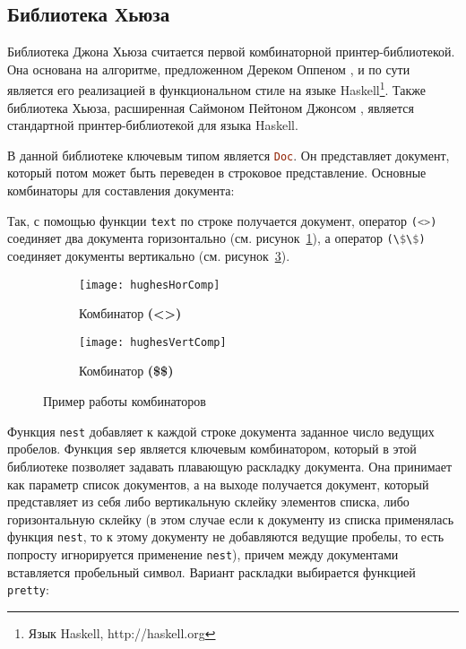 \subsection{Библиотека Хьюза}

Библиотека Джона Хьюза\cite{hughes} считается первой комбинаторной принтер-библиотекой. Она основана на алгоритме, предложенном Дереком Оппеном \cite{oppen}, и по сути является его реализацией в функциональном стиле на языке Haskell\footnote{Язык Haskell, http://haskell.org}. Также библиотека Хьюза, расширенная Саймоном Пейтоном Джонсом \cite{peytonJones}, является стандартной принтер-библиотекой для языка Haskell.


В данной библиотеке ключевым типом является \lstinline[language=Haskell]{Doc}. Он представляет документ, который потом может быть переведен в строковое представление.
Основные комбинаторы для составления документа:


Так, с помощью функции \lstinline[language=Haskell]{text} по строке получается документ, оператор \lstinline[language=Haskell]{(<>)} соединяет два документа горизонтально (см. рисунок~\ref{fig:hughesHorComp}), а оператор \lstinline[language=Haskell]{(\$\$)} соединяет документы вертикально (см. рисунок~\ref{fig:hughesVertComp}).

\begin{figure}[ht]
	\begin{subfigure}[b]{0.45\linewidth}
		\centering
		\texttt{[image: hughesHorComp]}
		\caption{Комбинатор \textbf{(<>)}}
		\label{fig:hughesHorComp}
	\end{subfigure}
	\hspace{0.5cm}
	\begin{subfigure}[b]{0.45\linewidth}
		\centering
		\texttt{[image: hughesVertComp]}
		\caption{Комбинатор \textbf{(\$\$)}}
		\label{fig:hughesVertComp}
	\end{subfigure}

	\caption{Пример работы комбинаторов}
\end{figure}

Функция \lstinline[language=Haskell]{nest} добавляет к каждой строке документа заданное число ведущих пробелов. Функция \lstinline[language=Haskell]{sep} является ключевым комбинатором, который в этой библиотеке позволяет задавать плавающую раскладку документа. Она принимает как параметр список документов, а на выходе получается документ, который представляет из себя либо вертикальную склейку элементов списка, либо горизонтальную склейку (в этом случае если к документу из списка применялась функция \lstinline[language=Haskell]{nest}, то к этому документу не добавляются ведущие пробелы, то есть попросту игнорируется применение \lstinline[language=Haskell]{nest}), причем между документами вставляется пробельный символ. Вариант раскладки выбирается функцией \lstinline[language=Haskell]{pretty}:

